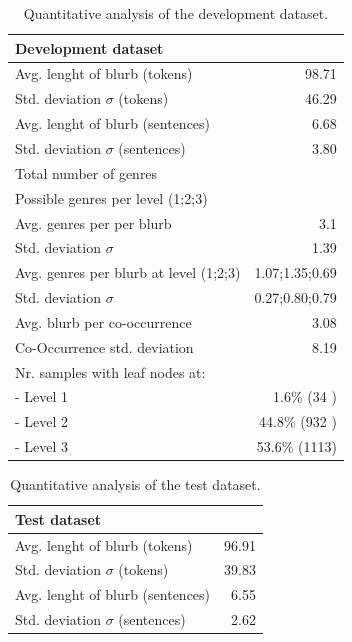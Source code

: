 \documentclass[11pt,a4paper]{article}
\begin{document}
\begin{table}
\small
\begin{center}
\begin{tabular}{|l|r|}
\hline\centering\textbf{Development dataset}  &             \\
\hline
Avg. lenght of blurb (tokens)              &   98.71        \\
Std. deviation $\sigma$ (tokens)           &   46.29        \\
Avg. lenght of blurb (sentences)           &   6.68         \\
Std. deviation $\sigma$ (sentences)        &   3.80         \\
\hline
Total number of genres                     &                   \\
Possible genres per level (1;2;3)          &                   \\
Avg. genres per per blurb                  &   3.1             \\
Std. deviation $\sigma$                    &   1.39            \\
Avg. genres per blurb at level (1;2;3)     &   1.07;1.35;0.69  \\
Std. deviation $\sigma$                    &   0.27;0.80;0.79  \\
\hline
Avg. blurb per co-occurrence               &   3.08            \\
Co-Occurrence std. deviation               &   8.19            \\
\hline
Nr. samples with leaf nodes at:            &                   \\
 - Level 1                                 &    1.6\% (34 )    \\
 - Level 2                                 &    44.8\% (932 )  \\
 - Level 3                                 &    53.6\% (1113)  \\
\hline
\end{tabular}
\end{center}
\caption{\label{quantitivy-analysis-train}Quantitative analysis of the development dataset.}
\end{table}


\begin{table}
\begin{center}
\begin{tabular}{|l|r|}
\hline\centering\textbf{Test dataset}  &         \\
\hline
Avg. lenght of blurb (tokens)              &  96.91             \\
Std. deviation $\sigma$ (tokens)           &  39.83             \\
Avg. lenght of blurb (sentences)           &  6.55              \\
Std. deviation $\sigma$ (sentences)        &  2.62              \\
\hline
\end{tabular}
\end{center}
\caption{\label{quantitivy-analysis-dev}Quantitative analysis of the test dataset.}
\end{table}
\end{document}
